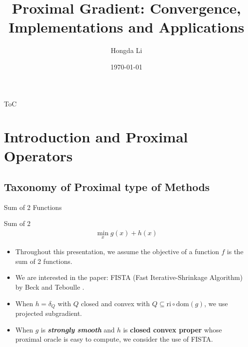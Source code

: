 \documentclass[11pt]{beamer}
\author{Hongda Li}
\title{Proximal Gradient: Convergence, Implementations and Applications}
\institute[]{UBC Okanagan}
\date{\today}
\begin{document}
\begin{frame}
    \titlepage
\end{frame}

\begin{frame}{ToC}
    \tableofcontents
\end{frame}

\section{Introduction and Proximal Operators}
    \subsection{Taxonomy of Proximal type of Methods}
        \begin{frame}{Sum of 2 Functions}
            \begin{block}{Sum of 2}
                \begin{align}
                    \min_{x} g(x) + h(x)
                \end{align}    
            \end{block}
            
            \begin{itemize}
                \item [1.]Throughout this presentation, we assume the objective of a function $f$ is the sum of 2 functions.
                \item [2.]We are interested in the paper: FISTA (Fast Iterative-Shrinkage Algorithm) by Beck and Teboulle \cite{paper:FISTA}. 
            \end{itemize}
            
            \begin{itemize}
                \item [1.] When $h = \delta_Q$ with $Q$ closed and convex with $Q\subseteq \text{ri}\circ \text{dom}(g)$, we use projected subgradient. 
                \item [2.] When $g$ is \textbf{\emph{strongly smooth}} and $h$ is \textbf{closed convex proper} whose proximal oracle is easy to compute, we consider the use of FISTA. 
                
            \end{itemize}
        \end{frame}
\end{document}
